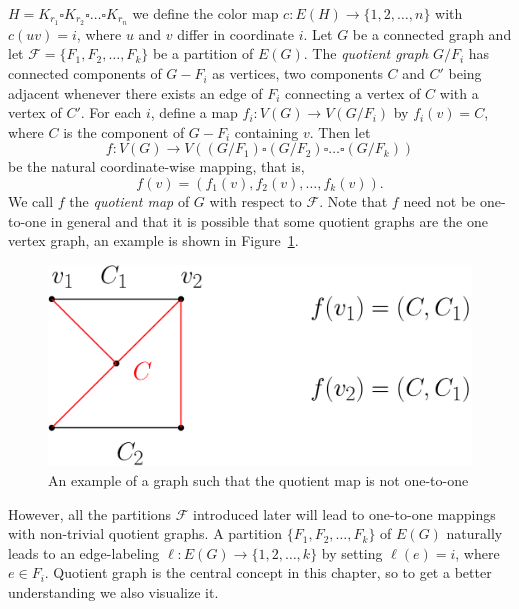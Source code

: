 \documentclass[12pt,a4paper,titlepage,openany]{report}
\begin{document}
$H=K_{r_1}\square K_{r_2}\square \ldots \square K_{r_n}$ we define the color map $c:E(H)\rightarrow \{1,2,\ldots, n\}$ with $c(uv)=i$, where $u$ and $v$ differ in coordinate $i$.
\newline
Let $G$ be a connected graph and let $\mathcal{F}=\{F_1,F_2,\ldots, F_k\}$ be a partition of $E(G)$. The \textit{quotient graph} $G/ F_i$ has connected components of $G- F_i$ as vertices, two components $C$ and $C'$ being adjacent whenever there exists an edge of $F_i$ connecting a vertex of $C$ with a vertex of $C'$. For each $i$, define a map $f_i:V(G)\rightarrow V(G/ F_i)$ by $f_i(v)=C$, where $C$ is the component of $G- F_i$ containing $v$. Then let
$$f:V(G)\to V((G/ F_1)\square (G/ F_2)\square \ldots \square (G/ F_k))$$
be the natural coordinate-wise mapping, that is,
$$f(v)=(f_1(v),f_2(v),\ldots , f_k(v)).$$
We call $f$ the \textit{quotient map} of $G$ with respect to $\mathcal{F}$. Note that $f$ need not be one-to-one in general and that it is possible that some quotient graphs are the one vertex graph, an example is shown in Figure~\ref{fnotonetoone}.
\begin{figure}[h]
\begin{center}
\includegraphics[width=0.75\linewidth]{figures/fnotonetoone.png}
\end{center}
\caption{An example of a graph such that the quotient map is not one-to-one}\label{fnotonetoone}
\end{figure}
 However, all the partitions $\mathcal{F}$ introduced later will lead to one-to-one mappings with non-trivial quotient graphs.\newline
A partition $\{F_1,F_2,\ldots ,F_k\}$ of $E(G)$ naturally leads to an edge-labeling $\ell:E(G)\to \{1,2,\ldots,k\}$ by setting $\ell(e)=i$, where $e\in F_i$.
\newline 
Quotient graph is the central concept in this chapter, so to get a better understanding we also visualize it.
\end{document}
